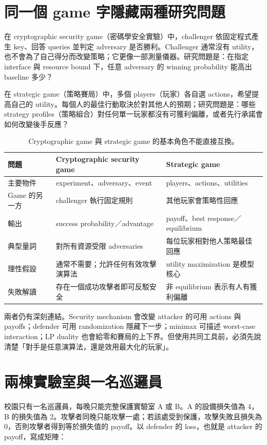 \documentclass[11pt,a4paper,oneside,openany]{book}
\begin{document}
\section{同一個 game 字隱藏兩種研究問題}
在 cryptographic security game（密碼學安全實驗）中，challenger 依固定程式產生 key、回答 queries 並判定 adversary 是否勝利。Challenger 通常沒有 utility，也不會為了自己得分而改變策略；它更像一部測量儀器。研究問題是：在指定 interface 與 resource bound 下，任意 adversary 的 winning probability 能高出 baseline 多少？

在 strategic game（策略賽局）中，多個 players（玩家）各自選 actions，希望提高自己的 utility。每個人的最佳行動取決於對其他人的預期；研究問題是：哪些 strategy profiles（策略組合）對任何單一玩家都沒有可獲利偏離，或者先行承諾會如何改變後手反應？

\begin{table}[htbp]
\centering
\caption{Cryptographic game 與 strategic game 的基本角色不能直接互換。}
\label{tab:two-kinds-games}
\begin{tabularx}{\textwidth}{@{}lYY@{}}
\toprule
問題 & Cryptographic security game & Strategic game \\
\midrule
主要物件 & experiment、adversary、event & players、actions、utilities \\
Game 的另一方 & challenger 執行固定規則 & 其他玩家會策略性回應 \\
輸出 & success probability／advantage & payoff、best response／equilibrium \\
典型量詞 & 對所有資源受限 adversaries & 每位玩家相對他人策略最佳回應 \\
理性假設 & 通常不需要；允許任何有效攻擊演算法 & utility maximization 是模型核心 \\
失敗解讀 & 存在一個成功攻擊者即可反駁安全 & 非 equilibrium 表示有人有獲利偏離 \\
\bottomrule
\end{tabularx}
\end{table}

兩者仍有深刻連結。Security mechanism 會改變 attacker 的可用 actions 與 payoffs；defender 可用 randomization 隱藏下一步；minimax 可描述 worst-case interaction；LP duality 也會給零和賽局的上下界。但使用共同工具前，必須先說清楚「對手是任意演算法，還是效用最大化的玩家」。

\section{兩棟實驗室與一名巡邏員}
校園只有一名巡邏員，每晚只能完整保護實驗室 A 或 B。A 的設備損失值為 4，B 的損失值為 2。攻擊者同晚只能攻擊一處；若該處受到保護，攻擊失敗且損失為 0，否則攻擊者得到等於損失值的 payoff。以 defender 的 loss，也就是 attacker 的 payoff，寫成矩陣：
\end{document}

